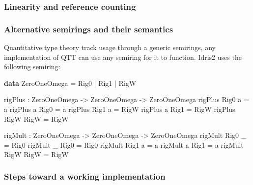 \documentclass[
]{article}
\newenvironment{Shaded}{}{}
\newcommand{\DataTypeTok}[1]{\textcolor[rgb]{0.56,0.13,0.00}{#1}}
\newcommand{\KeywordTok}[1]{\textcolor[rgb]{0.00,0.44,0.13}{\textbf{#1}}}
\newcommand{\NormalTok}[1]{#1}
\newcommand{\OperatorTok}[1]{\textcolor[rgb]{0.40,0.40,0.40}{#1}}
\newcommand{\OtherTok}[1]{\textcolor[rgb]{0.00,0.44,0.13}{#1}}
\begin{document}
\hypertarget{linearity-and-reference-counting}{%
\subsubsection{Linearity and reference
counting}\label{linearity-and-reference-counting}}

\hypertarget{alternative-semirings-and-their-semantics}{%
\subsubsection{Alternative semirings and their
semantics}\label{alternative-semirings-and-their-semantics}}

Quantitative type theory track usage through a generic semirings, any
implementation of QTT can use any semiring for it to function. Idris2
uses the following semiring:

\begin{Shaded}
\begin{Highlighting}[]
\KeywordTok{data} \DataTypeTok{ZeroOneOmega} \OtherTok{=} \DataTypeTok{Rig0} \OperatorTok{|} \DataTypeTok{Rig1} \OperatorTok{|} \DataTypeTok{RigW}

\NormalTok{rigPlus }\OperatorTok{:} \DataTypeTok{ZeroOneOmega} \OtherTok{{-}\textgreater{}} \DataTypeTok{ZeroOneOmega} \OtherTok{{-}\textgreater{}} \DataTypeTok{ZeroOneOmega}
\NormalTok{rigPlus }\DataTypeTok{Rig0}\NormalTok{ a }\OtherTok{=}\NormalTok{ a}
\NormalTok{rigPlus a }\DataTypeTok{Rig0} \OtherTok{=}\NormalTok{ a}
\NormalTok{rigPlus }\DataTypeTok{Rig1}\NormalTok{ a }\OtherTok{=} \DataTypeTok{RigW}
\NormalTok{rigPlus a }\DataTypeTok{Rig1} \OtherTok{=} \DataTypeTok{RigW}
\NormalTok{rigPlus }\DataTypeTok{RigW} \DataTypeTok{RigW} \OtherTok{=} \DataTypeTok{RigW}

\NormalTok{rigMult }\OperatorTok{:} \DataTypeTok{ZeroOneOmega} \OtherTok{{-}\textgreater{}} \DataTypeTok{ZeroOneOmega} \OtherTok{{-}\textgreater{}} \DataTypeTok{ZeroOneOmega}
\NormalTok{rigMult }\DataTypeTok{Rig0}\NormalTok{ \_ }\OtherTok{=} \DataTypeTok{Rig0}
\NormalTok{rigMult \_ }\DataTypeTok{Rig0} \OtherTok{=} \DataTypeTok{Rig0}
\NormalTok{rigMult }\DataTypeTok{Rig1}\NormalTok{ a }\OtherTok{=}\NormalTok{ a}
\NormalTok{rigMult a }\DataTypeTok{Rig1} \OtherTok{=}\NormalTok{ a}
\NormalTok{rigMult }\DataTypeTok{RigW} \DataTypeTok{RigW} \OtherTok{=} \DataTypeTok{RigW}
\end{Highlighting}
\end{Shaded}

\hypertarget{steps-toward-a-working-implementation}{%
\subsubsection{Steps toward a working
implementation}\label{steps-toward-a-working-implementation}}
\end{document}
